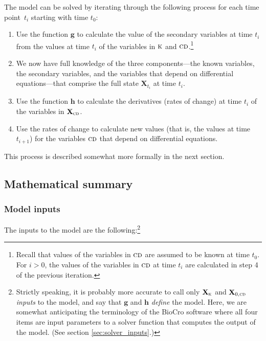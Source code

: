 \documentclass{article}
\newcommand{\boldX}{\mathbf{X}}
\newcommand{\cd}{\textsc{cd}}
\newcommand{\kn}{\textsc{k}} %
\newcommand{\g}{\mathbf{g}}
\newcommand{\h}{\mathbf{h}}
\begin{document}
The model can be solved by iterating through the following process for
each time point\ $t_i$ starting with time $t_0$:

\begin{enumerate}

\item Use the function $\g$ to calculate the value of the secondary
  variables at time $t_i$ from the values at time $t_i$ of the
  variables in $\kn$ and $\cd$.\footnote{Recall that values of the
    variables in $\cd$ are assumed to be known at time $t_0$.  For
    $i>0$, the values of the variables in $\cd$ at time $t_i$ are
    calculated in step 4 of the previous iteration.}
  
\item We now have full knowledge of the three components---the known
  variables, the secondary variables, and the variables that depend on
  differential equations---that comprise the full state $\boldX_{t_i}$
  at time $t_i$.

\item Use the function $\h$ to calculate the derivatives (rates of
  change) at time $t_i$ of the variables in $\boldX_\cd$.

\item Use the rates of change to calculate new values (that is, the
  values at time $t_{i+1}$) for the variables $\cd$ that depend on
  differential equations.

\end{enumerate}


This process is described somewhat more formally in the next section.

\subsection{Mathematical summary}
\label{sec:math_summary}

\subsubsection{Model inputs}
\label{sec:model_inputs}
The inputs to the model are the following:\footnote{Strictly speaking,
  it is probably more accurate to call only $\boldX_\kn$ and
  $\boldX_{0,\cd}$ \emph{inputs} to the model, and say that $\g$ and
  $\h$ \emph{define} the model.  Here, we are somewhat anticipating
  the terminology of the BioCro software where all four items are
  input parameters to a solver function that computes the output of
  the model.  (See section \ref{sec:solver_inputs}.)}
\end{document}
